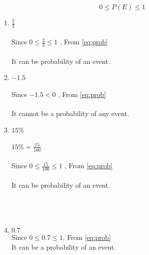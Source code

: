 \documentclass[journal,12pt,twocolumn]{IEEEtran}
\begin{document}
\begin{equation}
   \label{eq:prob}
   0 \le P(E)\le 1 
\end{equation}
\begin{enumerate}
    

\item \(\displaystyle\frac{2}{3}\)
\\
\\
\indent Since \(0 \le \displaystyle\frac{2}{3} \le 1\) , From \eqref{eq:prob}
\\
\\
\indent It can be probability of an event.
\\

\item \(-1.5\)
\\
\\
\indent Since  \( -1.5 < 0 \) , From \eqref{eq:prob}\\
\\
\indent It cannot be a probability of any event.
\\

\item \(15\%\)
\\
\\
\indent \(15\%=\displaystyle\frac{15}{100}\)
\\
\\
\indent Since \(0 \le \displaystyle\frac{15}{100} \le 1\) , From \eqref{eq:prob}
\\
\\
\indent It can be probability of an event.
\\
\\
\\
\\
\item \(0.7\)\\

Since \(0 \le 0.7 \le 1\), From \eqref{eq:prob}\\

It can be a probability of an event.
\end{enumerate}
\end{document}
